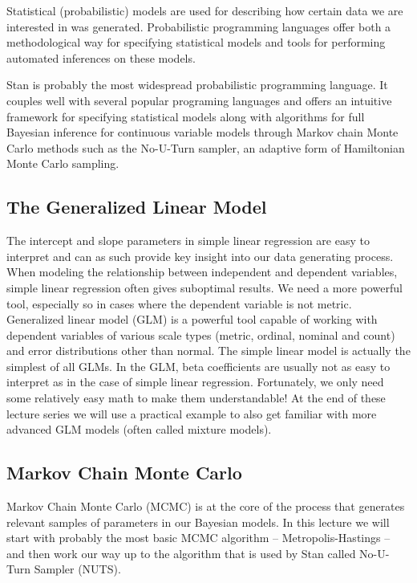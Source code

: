 \documentclass[fleqn,moreauthors,10pt]{ds_report}
\begin{document}
Statistical (probabilistic) models are used for describing how certain data we are interested in was generated. Probabilistic programming languages offer both a methodological way for specifying statistical models and tools for performing automated inferences on these models.

Stan is probably the most widespread probabilistic programming language. It couples well with several popular programing languages and offers an intuitive framework for specifying statistical models along with algorithms for full Bayesian inference for continuous variable models through Markov chain Monte Carlo methods such as the No-U-Turn sampler, an adaptive form of Hamiltonian Monte Carlo sampling.

\subsection*{The Generalized Linear Model}

The intercept and slope parameters in simple linear regression are easy to interpret and can as such provide key insight into our data generating process. When modeling the relationship between independent and dependent variables, simple linear regression often gives suboptimal results. We need a more powerful tool, especially so in cases where the dependent variable is not metric. Generalized linear model (GLM) is a powerful tool capable of working with dependent variables of various scale types (metric, ordinal, nominal and count) and error distributions other than normal. The simple linear model is actually the simplest of all GLMs. In the GLM, beta coefficients are usually not as easy to interpret as in the case of simple linear regression. Fortunately, we only need some relatively easy math to make them understandable! At the end of these lecture series we will use a practical example to also get familiar with more advanced GLM models (often called mixture models).

\subsection*{Markov Chain Monte Carlo}

Markov Chain Monte Carlo (MCMC) is at the core of the process that generates relevant samples of parameters in our Bayesian models. In this lecture we will start with probably the most basic MCMC algorithm -- Metropolis-Hastings -- and then work our way up to the algorithm that is used by Stan called No-U-Turn Sampler (NUTS).
\end{document}
